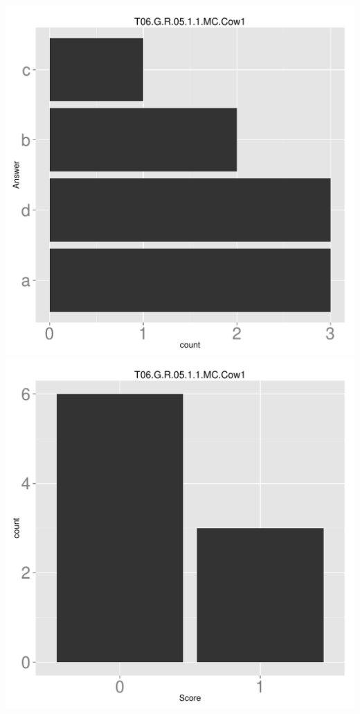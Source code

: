 \documentclass[12pt,english,nohyper]{tufte-handout}\usepackage[]{graphicx}\usepackage[]{color}
\begin{document}
\begin{center} \includegraphics[width=.45\linewidth]{Topic06_AB_74_answer} \includegraphics[width=.45\linewidth]{Topic06_AB_74_score} \end{center} 
\end{document}
